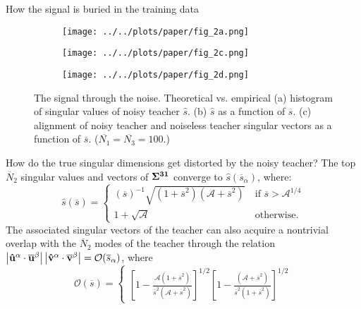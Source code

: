 \documentclass[final]{beamer}
\newcommand{\bb}[1]{{\bf\overline{#1}}}
\newcommand{\bh}[1]{{\bf\hat{#1}}}
\begin{document}
\begin{frame}[t]{}
\begin{columns}
\begin{column}{0.25\textwidth}
\begin{block}{\large How the signal is buried in the training data}
\begin{figure}
\vspace{-0.5em}
\centering
\begin{subfigure}[t]{0.44\textwidth}
\texttt{[image: ../../plots/paper/fig\_2a.png]}
\label{fig2b}
\end{subfigure}%
\begin{subfigure}[t]{0.30\textwidth}
\texttt{[image: ../../plots/paper/fig\_2c.png]}
\label{fig2c}
\end{subfigure}%
\begin{subfigure}[t]{0.21\textwidth}
\texttt{[image: ../../plots/paper/fig\_2d.png]}
\label{fig2d}
\end{subfigure}
\vspace{-1em}
\caption{The signal through the noise. Theoretical vs. empirical (a) histogram of singular values of noisy teacher \(\hat{s}\). (b) \(\hat{s}\) as a function of \(\overline{s}\). (c) alignment of noisy teacher and noiseless teacher singular vectors as a function of \(\overline{s}\). ($\overline{N_1}= \overline{N_3} = 100$.)}
\label{fig2}
\vspace{-0.5em}
\end{figure}
How do the true singular dimensions get distorted by the noisy teacher? The top $\overline{N}_2$ singular values and vectors of $\bf{\Sigma}^{31}$ converge to ${\hat s}(\overline{s}_\alpha)$, where:
\begin{equation}
\hat{s}(\overline{s}) = \begin{cases}
{(\overline{s})^{-1}}{\sqrt{(1+\overline{s}^2)(\mathcal{A}+\overline{s}^2)}}\ & \text{if } \overline{s} > \mathcal{A}^{1/4} \\
1+\sqrt{\mathcal{A}} & \text{otherwise}.
\end{cases}
\label{eq:shatsbar}
\end{equation}
The associated singular vectors of the teacher can also acquire a nontrivial overlap with the $\overline{N}_2$ modes of the teacher through the relation 
$\left\lvert {\bh u}^{\alpha} \cdot \bb{u}^{\beta} \right\rvert   \left\lvert{\bh v}^{\alpha} \cdot \bb{v}^{\beta} \right\rvert = \mathcal{O}(\overline{s}_\alpha)$, where 
\begin{equation}
\mathcal{O}(\overline{s}) = 
\begin{cases}
\left[1-
        \frac{\mathcal{A}(1+\overline{s}^2)}          
            {\overline{s}^2(\mathcal{A}+\overline{s}^2)}
\right]^{1/2} 
\left[1-
        \frac{(\mathcal{A}+\overline{s}^2)}          
            {\overline{s}^2(1+\overline{s}^2)}
\right]^{1/2}


\end{cases}
\end{equation}
\end{block}
\end{column}
\end{columns}
\end{frame}
\end{document}
